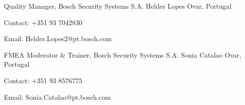 

\begin{cventries}

    
  \cventry
    {Quality Manager, Bosch Security Systems S.A.} %
    {Helder Lopes} %
    {Ovar, Portugal} %
    {} %
    {
      \begin{cvitems} %
        \item {Contact: +351 93 7042830}
        \item {Email: Helder.Lopes2@pt.bosch.com}
      \end{cvitems}
    }
    
\cventry
    {FMEA Moderator \& Trainer, Bosch Security Systems S.A.} %
    {Sonia Catalao} %
    {Ovar, Portugal} %
    {} %
    {
      \begin{cvitems} %
        \item {Contact: +351 93 8576775}
        \item {Email: Sonia.Catalao@pt.bosch.com}
      \end{cvitems}
    }
\end{cventries}
